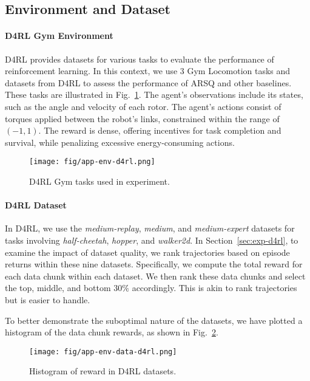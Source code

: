 \subsection{Environment and Dataset}
\label{sec:app-env}

\paragraph{D4RL Gym Environment}
D4RL \cite{D4RL} provides datasets for various tasks to evaluate the performance of reinforcement learning. 
In this context, we use 3 Gym Locomotion tasks and datasets from D4RL to assess the performance of ARSQ and other baselines. 
These tasks are illustrated in Fig.~\ref{fig:app-env-d4rl}. The agent's observations include its states, such as the angle and velocity of each rotor. 
The agent's actions consist of torques applied between the robot's links, constrained within the range of $(-1, 1)$. 
The reward is dense, offering incentives for task completion and survival, while penalizing excessive energy-consuming actions.

\begin{figure}[h]
    \centering
    \texttt{[image: fig/app-env-d4rl.png]}
    \caption{D4RL Gym tasks used in experiment.}
    \label{fig:app-env-d4rl}
\end{figure}

\paragraph{D4RL Dataset}
In D4RL, we use the \textit{medium-replay}, \textit{medium}, and \textit{medium-expert} datasets for tasks involving \textit{half-cheetah}, \textit{hopper}, and \textit{walker2d}. 
In Section~\ref{sec:exp-d4rl}, to examine the impact of dataset quality, we rank trajectories based on episode returns within these nine datasets. 
Specifically, we compute the total reward for each data chunk within each dataset. 
We then rank these data chunks and select the top, middle, and bottom $30\%$ accordingly.
This is akin to rank trajectories but is easier to handle.

To better demonstrate the suboptimal nature of the datasets, we have plotted a histogram of the data chunk rewards, as shown in Fig.~\ref{fig:app-env-data-d4rl}.

\begin{figure}[h]
    \centering
    \texttt{[image: fig/app-env-data-d4rl.png]}
    \caption{Histogram of reward in D4RL datasets.}
    \label{fig:app-env-data-d4rl}
\end{figure}


